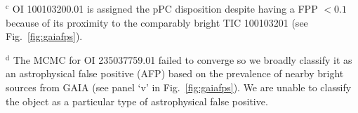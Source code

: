 \begin{landscape}
\begin{table*}
\begin{list}{}{}
\item $^{\text{c}}$ OI 100103200.01 is assigned the pPC disposition despite having a FPP $<0.1$ because of its proximity to the comparably bright TIC 100103201 (see Fig.~\ref{fig:gaiafps}).
  \item $^{\text{d}}$ The MCMC for OI 235037759.01 failed to converge so we broadly classify it as an astrophysical false positive (AFP) based on the prevalence of nearby bright sources from GAIA (see panel `v' in Fig.~\ref{fig:gaiafps}). We are unable to classify the object as a particular type of astrophysical false positive.
  \end{list}
\end{table*}
\clearpage
\end{landscape}
